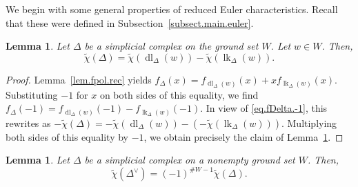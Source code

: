 \documentclass[12pt]{amsart}
\newtheorem{lemma}[theorem]{Lemma}
\theoremstyle{definition}
\DeclareMathOperator{\lk}{lk}
\DeclareMathOperator{\dl}{dl}
\newcommand{\tup}[1]{\left( #1 \right)}
\newcommand{\chitil}{\widetilde{\chi}}
\begin{document}
We begin with some general properties of reduced Euler characteristics.
Recall that these were defined in Subsection~\ref{subsect.main.euler}.

\begin{lemma} \label{lem.chitil.rec}
Let $\Delta$ be a simplicial complex on the ground set $W$. Let $w \in W$. Then,
\[
\chitil\tup{\Delta} = \chitil\tup{\dl_\Delta(w)} - \chitil\tup{\lk_\Delta(w)} .
\]
\end{lemma}

\begin{proof}
Lemma~\ref{lem.fpol.rec} yields
$f_{\Delta}\tup{x} = f_{\dl_\Delta(w)}\tup{x} + x f_{\lk_\Delta(w)}\tup{x}$.
Substituting $-1$ for $x$ on both sides of this equality,
we find
$f_{\Delta}\tup{-1} = f_{\dl_\Delta(w)}\tup{-1} - f_{\lk_\Delta(w)}\tup{-1}$.
In view of \eqref{eq.fDelta.-1}, this rewrites as
$-\chitil\tup{\Delta} = -\chitil\tup{\dl_\Delta(w)} - \tup{-\chitil\tup{\lk_\Delta(w)}}$.
Multiplying both sides of this equality by $-1$, we obtain precisely
the claim of Lemma~\ref{lem.chitil.rec}.
\end{proof}

\begin{lemma} \label{lem.chitil.dual}
Let $\Delta$ be a simplicial complex on a nonempty ground set $W$. Then,
\[
\chitil\tup{\Delta^\vee} = \tup{-1}^{\# W - 1} \chitil\tup{\Delta} .
\]
\end{lemma}
\end{document}
